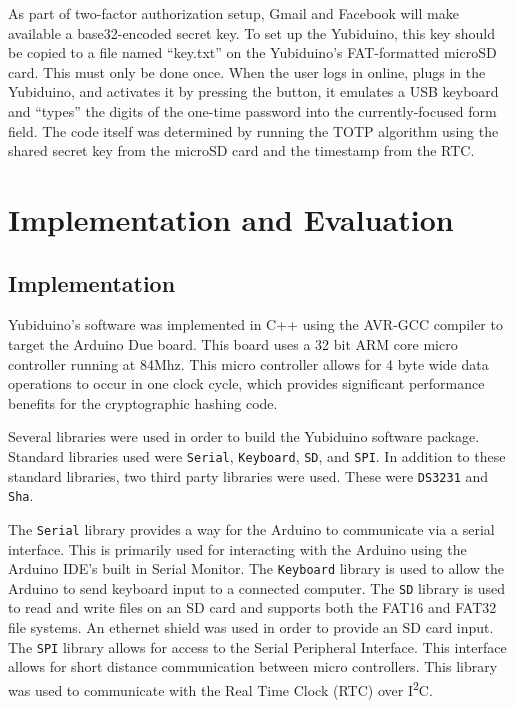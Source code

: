 \documentclass[conference]{IEEEtran}
\begin{document}
As part of two-factor authorization setup, Gmail and Facebook will make available a base32-encoded secret key. To set up the Yubiduino, this key should be copied to a file named ``key.txt'' on the Yubiduino's FAT-formatted microSD card. This must only be done once. When the user logs in online, plugs in the Yubiduino, and activates it by pressing the button, it emulates a USB keyboard and ``types'' the digits of the one-time password into the currently-focused form field. The code itself was determined by running the TOTP algorithm using the shared secret key from the microSD card and the timestamp from the RTC.

\section{Implementation and Evaluation}

\subsection{Implementation}


Yubiduino's software was implemented in C++ using the AVR-GCC compiler to
target the Arduino Due board.  This board uses a 32 bit ARM core micro
controller running at 84Mhz.  This micro controller allows for 4 byte wide data
operations to occur in one clock cycle, which provides significant performance
benefits for the cryptographic hashing code.

Several libraries were used in order to build the Yubiduino software package.
Standard libraries used were \texttt{Serial}, \texttt{Keyboard}, \texttt{SD},
and \texttt{SPI}.  In addition to these standard libraries, two third party
libraries were used.  These were \texttt{DS3231} and \texttt{Sha}.

The \texttt{Serial} library provides a way for the Arduino to communicate via a
serial interface.  This is primarily used for interacting with the Arduino
using the Arduino IDE's built in Serial Monitor. The \texttt{Keyboard} library
is used to allow the Arduino to send keyboard input to a connected computer.
The \texttt{SD} library is used to read and write files on an SD card and
supports both the FAT16 and FAT32 file systems.  An ethernet shield was used in
order to provide an SD card input. The \texttt{SPI} library allows for access
to the Serial Peripheral Interface.  This interface allows for short distance
communication between micro controllers.  This library was used to communicate
with the Real Time Clock (RTC) over I\textsuperscript{2}C.
\end{document}

